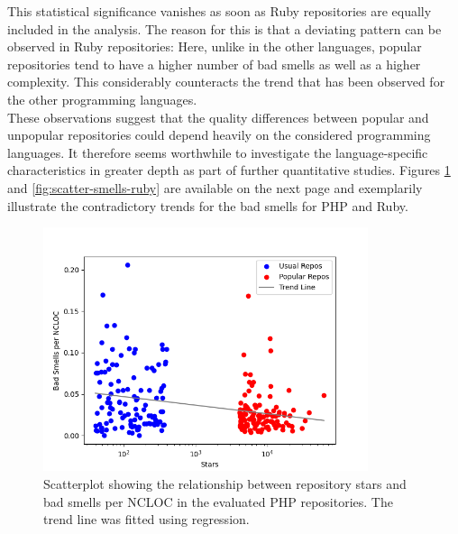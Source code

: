 \documentclass[a4paper, 12pt]{article}
\begin{document}
This statistical significance vanishes as soon as Ruby repositories are equally included in the analysis. The reason for this is that a deviating pattern can be observed in Ruby repositories: Here, unlike in the other languages, popular repositories tend to have a higher number of bad smells as well as a higher complexity. This considerably counteracts the trend that has been observed for the other programming languages.\\

These observations suggest that the quality differences between popular and unpopular repositories could depend heavily on the considered programming languages. It therefore seems worthwhile to investigate the language-specific characteristics in greater depth as part of further quantitative studies. Figures \ref{fig:scatter-smells} and \ref{fig:scatter-smells-ruby} are available on the next page and exemplarily illustrate the contradictory trends for the bad smells for PHP and Ruby.\\

\begin{figure}[h!]
  \centering
  \includegraphics[width=0.85\textwidth]{../media/php-smells-scatterplot.png}
  \caption{Scatterplot showing the relationship between repository stars and bad smells per NCLOC in the evaluated PHP repositories. The trend line was fitted using regression.}
  \label{fig:scatter-smells}
\end{figure}
\end{document}
